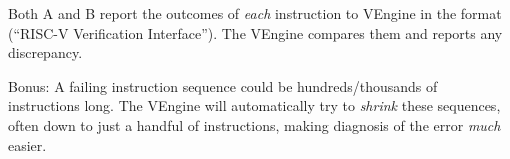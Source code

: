 \begin{frame}[fragile]
\begin{center}
\begin{minipage}{0.57\textwidth}
    \vspace*{1ex}

    Both A and B report the outcomes of \emph{each} instruction to
    VEngine in the {\RVFI} format (``RISC-V Verification Interface'').
    The VEngine compares them and reports any discrepancy.

    \vspace*{1ex}

    Bonus: A failing instruction sequence could be hundreds/thousands
    of instructions long. The VEngine will automatically try to
    \emph{shrink} these sequences, often down to just a handful of
    instructions, making diagnosis of the error \emph{much} easier.

 \end{minipage}
\end{center}

\end{frame}


